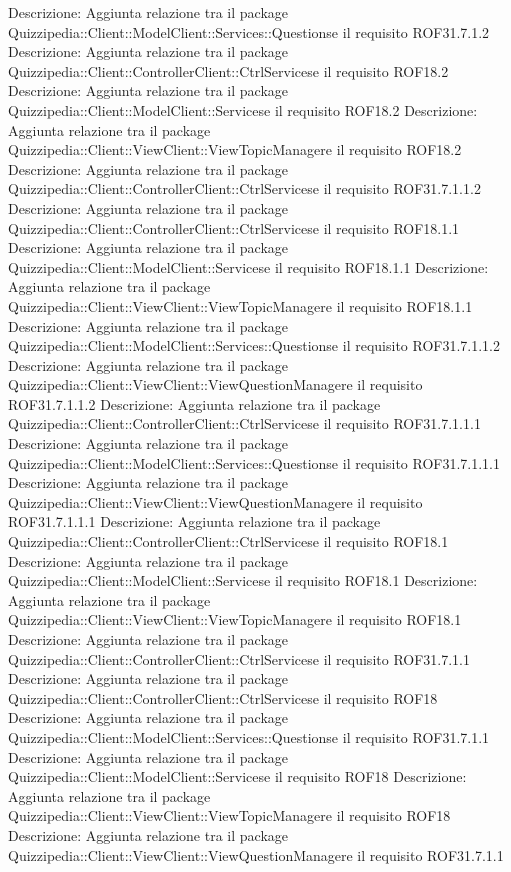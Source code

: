 Descrizione: Aggiunta relazione tra il package Quizzipedia::Client::ModelClient::Services::Questionse il requisito ROF31.7.1.2 
Descrizione: Aggiunta relazione tra il package Quizzipedia::Client::ControllerClient::CtrlServicese il requisito ROF18.2 
Descrizione: Aggiunta relazione tra il package Quizzipedia::Client::ModelClient::Servicese il requisito ROF18.2 
Descrizione: Aggiunta relazione tra il package Quizzipedia::Client::ViewClient::ViewTopicManagere il requisito ROF18.2 
Descrizione: Aggiunta relazione tra il package Quizzipedia::Client::ControllerClient::CtrlServicese il requisito ROF31.7.1.1.2 
Descrizione: Aggiunta relazione tra il package Quizzipedia::Client::ControllerClient::CtrlServicese il requisito ROF18.1.1 
Descrizione: Aggiunta relazione tra il package Quizzipedia::Client::ModelClient::Servicese il requisito ROF18.1.1 
Descrizione: Aggiunta relazione tra il package Quizzipedia::Client::ViewClient::ViewTopicManagere il requisito ROF18.1.1 
Descrizione: Aggiunta relazione tra il package Quizzipedia::Client::ModelClient::Services::Questionse il requisito ROF31.7.1.1.2 
Descrizione: Aggiunta relazione tra il package Quizzipedia::Client::ViewClient::ViewQuestionManagere il requisito ROF31.7.1.1.2 
Descrizione: Aggiunta relazione tra il package Quizzipedia::Client::ControllerClient::CtrlServicese il requisito ROF31.7.1.1.1 
Descrizione: Aggiunta relazione tra il package Quizzipedia::Client::ModelClient::Services::Questionse il requisito ROF31.7.1.1.1 
Descrizione: Aggiunta relazione tra il package Quizzipedia::Client::ViewClient::ViewQuestionManagere il requisito ROF31.7.1.1.1 
Descrizione: Aggiunta relazione tra il package Quizzipedia::Client::ControllerClient::CtrlServicese il requisito ROF18.1 
Descrizione: Aggiunta relazione tra il package Quizzipedia::Client::ModelClient::Servicese il requisito ROF18.1 
Descrizione: Aggiunta relazione tra il package Quizzipedia::Client::ViewClient::ViewTopicManagere il requisito ROF18.1 
Descrizione: Aggiunta relazione tra il package Quizzipedia::Client::ControllerClient::CtrlServicese il requisito ROF31.7.1.1 
Descrizione: Aggiunta relazione tra il package Quizzipedia::Client::ControllerClient::CtrlServicese il requisito ROF18 
Descrizione: Aggiunta relazione tra il package Quizzipedia::Client::ModelClient::Services::Questionse il requisito ROF31.7.1.1 
Descrizione: Aggiunta relazione tra il package Quizzipedia::Client::ModelClient::Servicese il requisito ROF18 
Descrizione: Aggiunta relazione tra il package Quizzipedia::Client::ViewClient::ViewTopicManagere il requisito ROF18 
Descrizione: Aggiunta relazione tra il package Quizzipedia::Client::ViewClient::ViewQuestionManagere il requisito ROF31.7.1.1 
